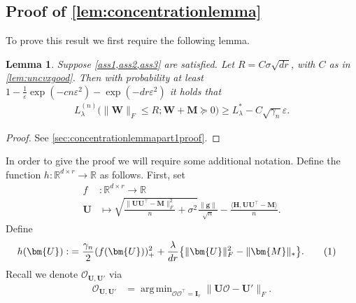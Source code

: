 \documentclass[10pt]{article}
\newcommand\numberthis{\addtocounter{equation}{1}\tag{\theequation}}
\DeclareMathOperator*{\argmin}{arg\,min}
\newcommand{\eps}{\ensuremath{\varepsilon}}
\newcommand{\s}{^*}
\renewcommand{\t}{^{\top}}
\newtheorem{lemma}{Lemma}
\theoremstyle{definition}
\begin{document}
\subsection{Proof of \cref{lem:concentrationlemma}}\label{sec:concentrationlemmaproof}
To prove this result we first require the following lemma.  
\begin{lemma}\label{lem:concentrationlemmapart1}
Suppose \cref{ass1,ass2,ass3} are satisfied.  Let $R = C \sigma \sqrt{dr}$, with $C$ as in \cref{lem:uncvxgood}. 
Then with probability at least 
$1 -   \frac{1}{\eps} \exp( - c n \eps^2) - \exp(-dr \eps^2) $
it holds that
\begin{align}
    L_{\lambda}^{(n)}\bigg( \| \bm{W} \|_F \leq R; \bm{W} + \bm{M} \succcurlyeq 0 \bigg) \geq L_{\lambda}\s - C \sqrt{\gamma_n} \eps.
\end{align}
\end{lemma}
\begin{proof}
    See \cref{sec:concentrationlemmapart1proof}. 
\end{proof}



In order to give the proof we will require some additional notation.  Define the function $h: \mathbb{R}^{d\times r} \to \mathbb{R}$ as follows.  First, set 
\begin{align}
f &: \mathbb{R}^{d\times r} \to \mathbb{R} \\
   \bm{U} &\mapsto  \sqrt{\frac{\| \bm{UU}\t - \bm{M} \|_F^2}{n} + \sigma^2} \frac{\|\bm{g}\|}{\sqrt{n}} -  \frac{\langle \bm{H}, \bm{UU}\t - \bm{M}\rangle}{n}.
\end{align}
Define
\begin{align}
    h(\bm{U}) :&= \frac{\gamma_n}{2} ( f(\bm{U}) )^2_+ + \frac{\lambda}{dr} \big\{ \| \bm{U} \|_F^2 - \| \bm{M} \|_* \big\}.\numberthis \label{hdef}
\end{align}
Recall we denote $\mathcal{O}_{\bm{U},\bm{U}'}$ via
\begin{align}
    \mathcal{O}_{\bm{U},\bm{U}'} &= \argmin_{\mathcal{OO}\t = \bm{I}_r} \| \bm{U} \mathcal{O} - \bm{U}' \|_F.
\end{align}
\end{document}
